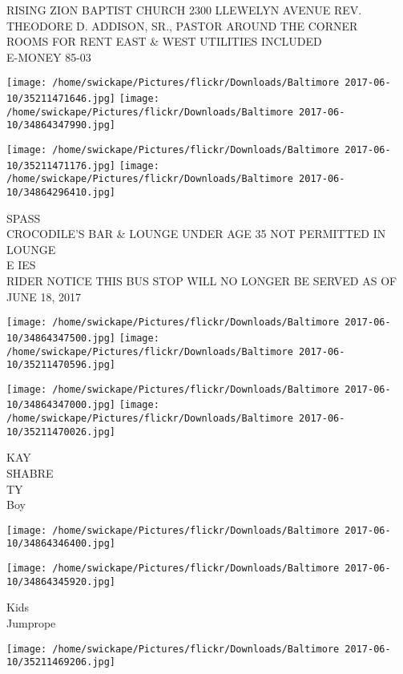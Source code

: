 \documentclass[10pt,letterpaper]{article}
\begin{document}
RISING ZION BAPTIST CHURCH 2300 LLEWELYN AVENUE REV. THEODORE D. ADDISON, SR., PASTOR AROUND THE CORNER\\
ROOMS FOR RENT EAST \& WEST UTILITIES INCLUDED\\
E{-}MONEY 85{-}03\\
\pagebreak

\texttt{[image: /home/swickape/Pictures/flickr/Downloads/Baltimore 2017-06-10/35211471646.jpg]}
\texttt{[image: /home/swickape/Pictures/flickr/Downloads/Baltimore 2017-06-10/34864347990.jpg]}

\texttt{[image: /home/swickape/Pictures/flickr/Downloads/Baltimore 2017-06-10/35211471176.jpg]}
\texttt{[image: /home/swickape/Pictures/flickr/Downloads/Baltimore 2017-06-10/34864296410.jpg]}

SPASS\\
CROCODILE'S BAR \& LOUNGE UNDER AGE 35 NOT PERMITTED IN LOUNGE\\
E IES\\
RIDER NOTICE THIS BUS STOP WILL NO LONGER BE SERVED AS OF JUNE 18, 2017\\
\pagebreak

\texttt{[image: /home/swickape/Pictures/flickr/Downloads/Baltimore 2017-06-10/34864347500.jpg]}
\texttt{[image: /home/swickape/Pictures/flickr/Downloads/Baltimore 2017-06-10/35211470596.jpg]}

\texttt{[image: /home/swickape/Pictures/flickr/Downloads/Baltimore 2017-06-10/34864347000.jpg]}
\texttt{[image: /home/swickape/Pictures/flickr/Downloads/Baltimore 2017-06-10/35211470026.jpg]}

KAY\\
SHABRE\\
TY\\
Boy\\
\pagebreak

\texttt{[image: /home/swickape/Pictures/flickr/Downloads/Baltimore 2017-06-10/34864346400.jpg]}

\vspace{0.25in}
\texttt{[image: /home/swickape/Pictures/flickr/Downloads/Baltimore 2017-06-10/34864345920.jpg]}

Kids\\
Jumprope\\
\pagebreak

\texttt{[image: /home/swickape/Pictures/flickr/Downloads/Baltimore 2017-06-10/35211469206.jpg]}
\end{document}
